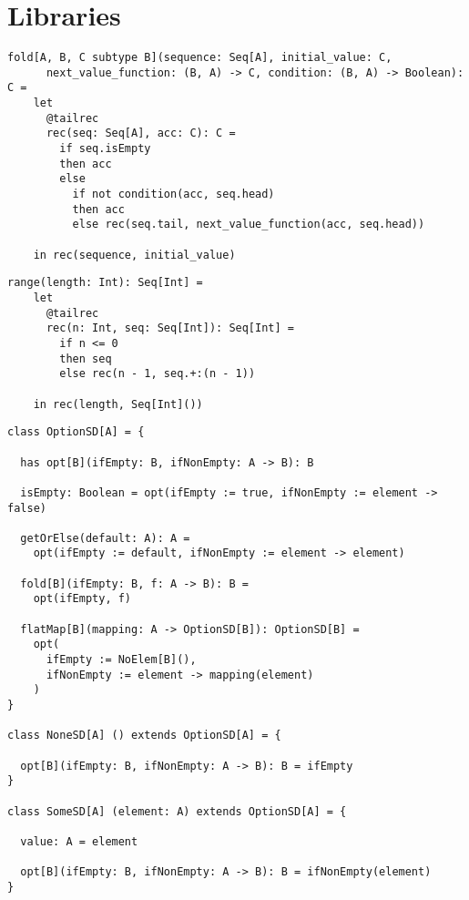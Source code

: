 \chapter{Libraries}

\begin{lstlisting}[label={lst:foldLeftWhile}]
  fold[A, B, C subtype B](sequence: Seq[A], initial_value: C,
      next_value_function: (B, A) -> C, condition: (B, A) -> Boolean): C =
    let
      @tailrec
      rec(seq: Seq[A], acc: C): C =
        if seq.isEmpty
        then acc
        else
          if not condition(acc, seq.head)
          then acc
          else rec(seq.tail, next_value_function(acc, seq.head))

    in rec(sequence, initial_value)
\end{lstlisting}

\begin{lstlisting}[label={lst:range}]
  range(length: Int): Seq[Int] =
    let
      @tailrec
      rec(n: Int, seq: Seq[Int]): Seq[Int] =
        if n <= 0
        then seq
        else rec(n - 1, seq.+:(n - 1))

    in rec(length, Seq[Int]())
\end{lstlisting}


\begin{lstlisting}[label={lst:option}]
class OptionSD[A] = {

  has opt[B](ifEmpty: B, ifNonEmpty: A -> B): B

  isEmpty: Boolean = opt(ifEmpty := true, ifNonEmpty := element -> false)

  getOrElse(default: A): A =
    opt(ifEmpty := default, ifNonEmpty := element -> element)

  fold[B](ifEmpty: B, f: A -> B): B =
    opt(ifEmpty, f)

  flatMap[B](mapping: A -> OptionSD[B]): OptionSD[B] =
    opt(
      ifEmpty := NoElem[B](),
      ifNonEmpty := element -> mapping(element)
    )
}

class NoneSD[A] () extends OptionSD[A] = {

  opt[B](ifEmpty: B, ifNonEmpty: A -> B): B = ifEmpty
}

class SomeSD[A] (element: A) extends OptionSD[A] = {

  value: A = element

  opt[B](ifEmpty: B, ifNonEmpty: A -> B): B = ifNonEmpty(element)
}
\end{lstlisting}


